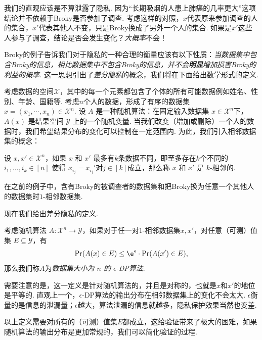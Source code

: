 我们的直观应该是不算泄露了隐私. 因为“长期吸烟的人患上肺癌的几率更大”这项结论并不依赖于Broky是否参加了调查. 考虑这样的对照，$x$代表原来参加调查的人的集合，$x'$代表其他人不变，只是Broky换成了另外一个人的集合. 如果是$x'$这些人参与了调查，结论是否会发生变化？\emph{大概率}不会！

Broky的例子告诉我们对于隐私的一种合理的衡量应该有以下性质：\emph{当数据集中包含Broky的信息，相比数据集中不包含Broky的信息，并不会\textbf{明显}增加损害Broky的利益的概率.} 这一思想引出了\emph{差分隐私}的概念，我们将在下面给出数学形式的定义.

考虑数据的空间$\mathcal X$，其中的每一个元素都包含了个体的所有可能数据例如姓名、性别、年龄、国籍等. 考虑$n$个人的数据，形成了有序的数据集$x = (x_1, \cdots, x_n) \in \mathcal X^n$.  设 $A$ 是一种随机算法：在固定输入数据集 $x \in \mathcal X^n$下，$A(x)$ 是结果空间 $\mathcal Y$ 上的一个随机变量. 当我们改变（增加或删除）一个人的数据时，我们希望结果分布的变化可以控制在一定范围内. 为此，我们引入相邻数据集的概念：

\begin{definition}[$k$-相邻数据集]
    设 $x, x' \in \mathcal X^n$，如果 $x$ 和 $x'$ 最多有$k$条数据不同，即至多存在$k$个不同的$i_1,\dots,i_k \in [n]$ 使得 $x_{i_j}=x_{i_j}'$对$j\in[k]$成立，那么称 $x$ 和 $x'$ 是 $k$-相邻的.
\end{definition}

在之前的例子中，含有Broky的被调查者的数据集和把Broky换为任意一个其他人的数据集时$1$-相邻数据集.

现在我们给出差分隐私的定义. 

\begin{definition}[$\epsilon$-DP]
考虑随机算法 $A : \mathcal X^n \to \mathcal Y$，如果对于任一对$1$-相邻数据集$x, x'$，对任意（可测）值集 $E \subseteq \mathcal Y$，有
\[
\Pr(A(x)\in E) \leq \e^{\epsilon} \cdot \Pr(A(x')\in E),
\]
那么我们称$A$为\emph{数据集大小为 $n$ 的 $\epsilon$-DP算法}.
\end{definition}

需要注意的是，这一定义是针对随机算法的，并且是对称的，也就是$x$和$x'$的地位是平等的. 直观上一个，$\epsilon$-DP算法的输出分布在相邻数据集上的变化不会太大. $\epsilon$衡量的是信息的泄漏量；$\epsilon$越大，算法泄漏的信息就越多，隐私保护效果当然也变差.

以上定义需要对所有的（可测）值集$E$都成立，这给验证带来了极大的困难，如果随机算法的输出分布是更加常规的，我们可以简化验证的过程. 

